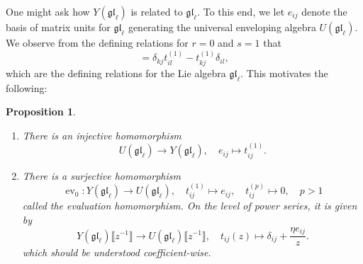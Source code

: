 \documentclass[11pt]{report}
\newtheorem{prop}[theorem]{Proposition}
\theoremstyle{definition}
\theoremstyle{remark}
\theoremstyle{remark}
\begin{document}
One might ask how $Y(\mathfrak{gl}_\ell)$ is related to $\mathfrak{gl}_\ell$. To this end, we let $e_{ij}$ denote the basis of matrix units for $\mathfrak{gl}_\ell$ generating the universal enveloping algebra $U(\mathfrak{gl}_\ell)$. We observe from the defining relations for $r=0$ and $s=1$ that
\begin{equation*}
[t_{ij}^{(1)},t_{kl}^{(1)}] = \delta_{kj} t_{il}^{(1)} - t_{kj}^{(1)} \delta_{il},
\end{equation*}
which are the defining relations for the Lie algebra $\mathfrak{gl}_\ell$. This motivates the following:

\begin{prop}
\begin{enumerate}[label=(\roman*)]
\item There is an injective homomorphism
\begin{equation*}
U(\mathfrak{gl}_\ell) \to Y(\mathfrak{gl}_\ell), \quad e_{ij} \mapsto t_{ij}^{(1)}.
\end{equation*}
\item There is a surjective homomorphism
\begin{equation*}
\operatorname{ev}_0: Y(\mathfrak{gl}_\ell) \to U(\mathfrak{gl}_\ell), \quad t_{ij}^{(1)} \mapsto e_{ij}, \quad t_{ij}^{(p)} \mapsto 0, \quad p>1
\end{equation*}
called the \emph{evaluation homomorphism}. On the level of power series, it is given by
\begin{equation*}
Y(\mathfrak{gl}_\ell)\llbracket z^{-1} \rrbracket \to U(\mathfrak{gl}_\ell)\llbracket z^{-1} \rrbracket, \quad t_{ij}(z) \mapsto \delta_{ij} + \frac{\eta e_{ij}}{z}.
\end{equation*}
which should be understood coefficient-wise.
\end{enumerate}
\end{prop}
\end{document}

